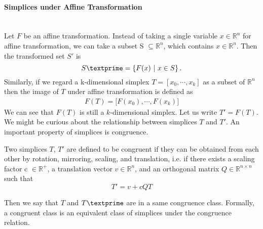     \paragraph{Simplices under Affine Transformation}\mbox{}\\
    Let $F$ be an affine transformation. 
    Instead of taking a single variable $x\in\mathbb{R}^n$ for affine transformation, we can take a subset S $\subseteq\mathbb{R}^n$, which contains $x\in\mathbb{R}^n$. Then the transformed set $S'$ is
    \begin{equation*}
    S\textprime= \left\{{F}(x) ~|~ x\in S \right\}.
    \end{equation*}
    Similarly, if we regard a k-dimensional simplex ${T} = [{x_0, \cdots, x_k}]$ as a subset of $\mathbb{R}^n$ then the image of ${T}$ under affine transformation is defined as
    \begin{equation*}
    \begin{split}
    {F}({T}) = \big[{F}(x_0), \cdots , {F}(x_k)\big]
    \end{split}
    \end{equation*}
    We can see that $F(T)$ is still a $k$-dimensional simplex. Let us write $T' = F(T)$. We might be curious about the relationship between simplices $T$ and $T'$. 
    An important property of simplices is congruence.

    \begin{definition}
    Two simplices $T$, $T'$ are defined to be congruent if they can be obtained from each other by rotation, mirroring, scaling, and translation, i.e. if there exists a scaling factor c $\in\mathbb{R}^{+}$, a translation vector $v\in\mathbb{R}^n$, and an orthogonal matrix $Q\in\mathbb{R}^{n\times n}$ such that
    \begin{equation*}
    T' = v + cQT
    \end{equation*}
    \end{definition}
    \noindent
    Then we say that ${T}$ and ${T}\textprime$ are in a same congruence class. Formally, a congruent class is an equivalent class of simplices under the congruence relation.
    